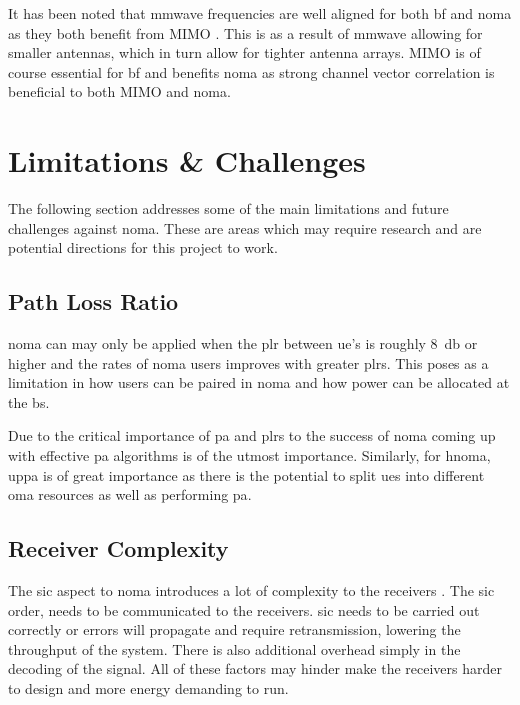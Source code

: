 \par
It has been noted that \ac{mmwave} frequencies are well aligned for both \acl{bf} and \ac{noma} as they both benefit from MIMO \cite{ding:2017}.
This is as a result of \ac{mmwave} allowing for smaller antennas, which in turn allow for tighter antenna arrays.
MIMO is of course essential for \acl{bf} and benefits \ac{noma} as strong channel vector  correlation is beneficial to both MIMO and \ac{noma}.

\section{Limitations \& Challenges}

The following section addresses some of the main limitations and future challenges against \ac{noma}.
These are areas which may require research and are potential directions for this project to work.

\subsection{Path Loss Ratio}
\ac{noma} can may only be applied when the \ac{plr} between \ac{ue}'s is roughly \SI{8}{\decibel} or higher and the rates of \ac{noma} users improves with greater \acp{plr}\cite{ding:2016,yazaki:2014,islam:2017web}.
This poses as a limitation in how users can be paired in \ac{noma} and how power can be allocated at the \ac{bs}.

\par
Due to the critical importance of \ac{pa} and \acp{plr} to the success of \ac{noma} coming up with effective \ac{pa} algorithms is of the utmost importance.
Similarly, for \ac{hnoma}, \ac{uppa} is of great importance as there is the potential to split \acp{ue} into different \ac{oma} resources as well as performing \ac{pa}.

\subsection{Receiver Complexity}
The \ac{sic} aspect to \ac{noma} introduces a lot of complexity to the receivers \cite{islam:2017,islam:2017web}.
The \ac{sic} order, needs to be communicated to the receivers.
\ac{sic} needs to be carried out correctly or errors will propagate and require retransmission, lowering the throughput of the system.
There is also additional overhead simply in the decoding of the signal.
All of these factors may hinder make the receivers harder to design and more energy demanding to run.

